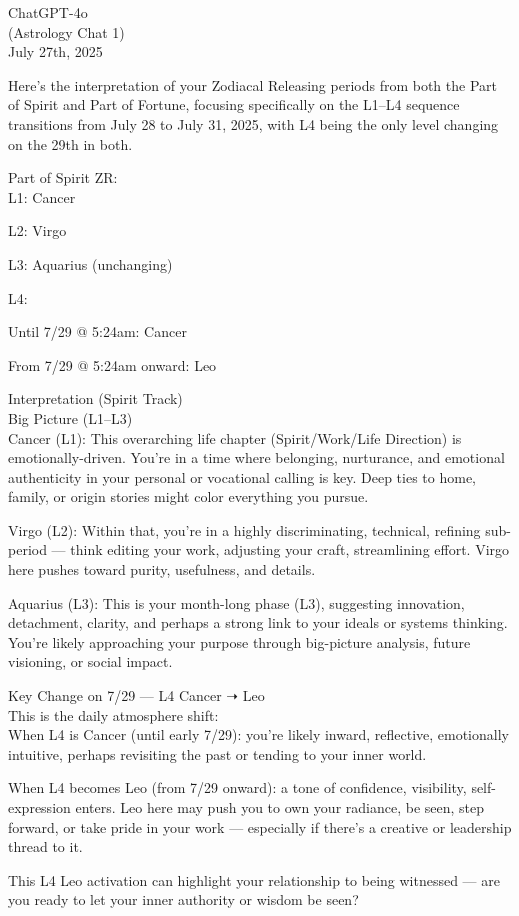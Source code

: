 \documentclass{article}
\begin{document}
ChatGPT-4o\\
(Astrology Chat 1)\\
July 27th, 2025

Here's the interpretation of your Zodiacal Releasing periods from both
the Part of Spirit and Part of Fortune, focusing specifically on the
L1--L4 sequence transitions from July 28 to July 31, 2025, with L4 being
the only level changing on the 29th in both.

 Part of Spirit ZR:\\
L1: Cancer

L2: Virgo

L3: Aquarius (unchanging)

L4:

Until 7/29 @ 5:24am: Cancer

From 7/29 @ 5:24am onward: Leo

 Interpretation (Spirit Track)\\
Big Picture (L1--L3)\\
Cancer (L1): This overarching life chapter (Spirit/Work/Life Direction)
is emotionally-driven. You're in a time where belonging, nurturance, and
emotional authenticity in your personal or vocational calling is key.
Deep ties to home, family, or origin stories might color everything you
pursue.

Virgo (L2): Within that, you're in a highly discriminating, technical,
refining sub-period --- think editing your work, adjusting your craft,
streamlining effort. Virgo here pushes toward purity, usefulness, and
details.

Aquarius (L3): This is your month-long phase (L3), suggesting
innovation, detachment, clarity, and perhaps a strong link to your
ideals or systems thinking. You're likely approaching your purpose
through big-picture analysis, future visioning, or social impact.

Key Change on 7/29 --- L4 Cancer ➝ Leo\\
This is the daily atmosphere shift:\\
When L4 is Cancer (until early 7/29): you're likely inward, reflective,
emotionally intuitive, perhaps revisiting the past or tending to your
inner world.

When L4 becomes Leo (from 7/29 onward): a tone of confidence,
visibility, self-expression enters. Leo here may push you to own your
radiance, be seen, step forward, or take pride in your work ---
especially if there's a creative or leadership thread to it.

This L4 Leo activation can highlight your relationship to being
witnessed --- are you ready to let your inner authority or wisdom be
seen?
\end{document}

